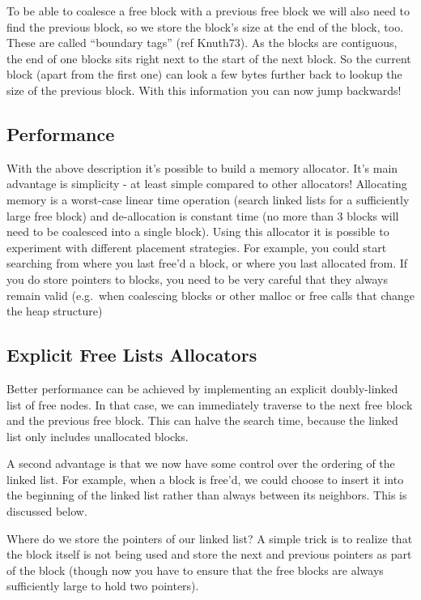 To be able to coalesce a free block with a previous free block we will
also need to find the previous block, so we store the block's size at
the end of the block, too. These are called ``boundary tags'' (ref
Knuth73). As the blocks are contiguous, the end of one blocks sits right
next to the start of the next block. So the current block (apart from
the first one) can look a few bytes further back to lookup the size of
the previous block. With this information you can now jump backwards!

\subsection{Performance}\label{performance}

With the above description it's possible to build a memory allocator.
It's main advantage is simplicity - at least simple compared to other
allocators! Allocating memory is a worst-case linear time operation
(search linked lists for a sufficiently large free block) and
de-allocation is constant time (no more than 3 blocks will need to be
coalesced into a single block). Using this allocator it is possible to
experiment with different placement strategies. For example, you could
start searching from where you last free'd a block, or where you last
allocated from. If you do store pointers to blocks, you need to be very
careful that they always remain valid (e.g.~when coalescing blocks or
other malloc or free calls that change the heap structure)

\subsection{Explicit Free Lists
Allocators}\label{explicit-free-lists-allocators}

Better performance can be achieved by implementing an explicit
doubly-linked list of free nodes. In that case, we can immediately
traverse to the next free block and the previous free block. This can
halve the search time, because the linked list only includes unallocated
blocks.

A second advantage is that we now have some control over the ordering of
the linked list. For example, when a block is free'd, we could choose to
insert it into the beginning of the linked list rather than always
between its neighbors. This is discussed below.

Where do we store the pointers of our linked list? A simple trick is to
realize that the block itself is not being used and store the next and
previous pointers as part of the block (though now you have to ensure
that the free blocks are always sufficiently large to hold two
pointers).


